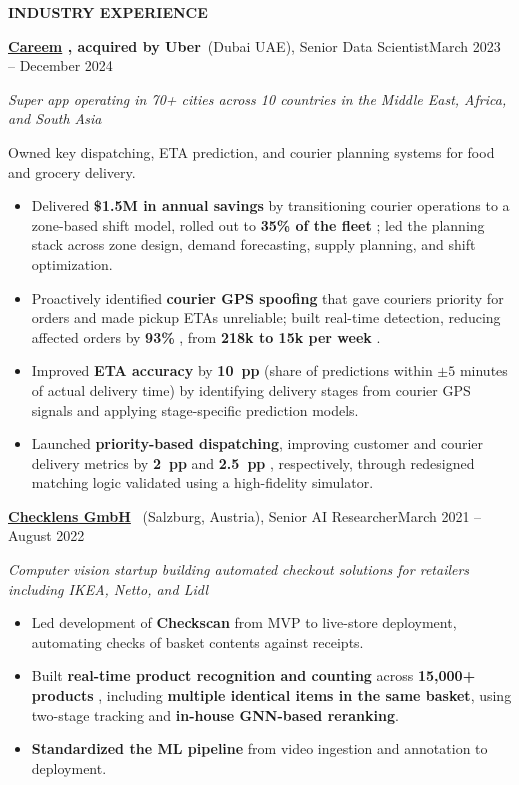 \documentclass[11pt,a4paper]{article}
\newcommand{\sectionletterspacing}[1]{{\addfontfeatures{LetterSpace=14}#1}}
\newcommand{\SectionFont}{\fontsize{15.2}{18.8}\selectfont}
\newcommand{\TitleFont}{\fontsize{12.8}{15.8}\selectfont}
\newcommand{\DateFont}{\fontsize{12.1}{15.0}\selectfont}
\newcommand{\DescFont}{\fontsize{10.2}{12.7}\selectfont}
\newcommand{\muted}[1]{\textcolor{secondary}{#1}}
\newcommand{\metric}[1]{%
  \textcolor{accent}{\textbf{#1}}%
}
\newcommand{\companylink}[2]{%
  \href{#2}{\textcolor{textgray}{#1}}%
}
\newcommand{\sectiontitle}[1]{%
  \vspace{0.64em}
  {\centering\SectionFont\bfseries\textcolor{accent}{\sectionletterspacing{#1}}\par}
  \vspace{0.28em}
}
\newcommand{\jobtitle}[4]{%
  {\TitleFont\bfseries #1}{\TitleFont\textnormal{\muted{\ (#2)}}}{\TitleFont\textnormal{, #3}}\hfill{\DateFont\textnormal{\muted{#4}}}\par
}
\newcommand{\jobgap}{\vspace{0.55em}}
\begin{document}
\sectiontitle{INDUSTRY EXPERIENCE}

\jobtitle{\companylink{Careem}{https://www.careem.com/}\textnormal{, acquired by Uber}}{Dubai UAE}{Senior Data Scientist}{March 2023 -- December 2024}
{\DescFont\muted{\textit{Super app operating in 70+ cities across 10 countries in the Middle East, Africa, and South Asia}}\par}
Owned key dispatching, ETA prediction, and courier planning systems for food and grocery delivery.\par
\begin{itemize}
  \item Delivered \metric{\$1.5M in annual savings} by transitioning courier operations to a zone-based shift model, rolled out to \metric{35\% of the fleet}; led the planning stack across zone design, demand forecasting, supply planning, and shift optimization.
  \item Proactively identified \textbf{courier GPS spoofing} that gave couriers priority for orders and made pickup ETAs unreliable; built real-time detection, reducing affected orders by \metric{93\%}, from \metric{218k to 15k per week}.
  \item Improved \textbf{ETA accuracy} by \metric{10~pp} (share of predictions within \(\pm 5\) minutes of actual delivery time) by identifying delivery stages from courier GPS signals and applying stage-specific prediction models.
  \item Launched \textbf{priority-based dispatching}, improving customer and courier delivery metrics by \metric{2~pp} and \metric{2.5~pp}, respectively, through redesigned matching logic validated using a high-fidelity simulator.
\end{itemize}

\jobgap
\jobtitle{\companylink{Checklens GmbH}{https://checklens.ai/}}{Salzburg, Austria}{Senior AI Researcher}{March 2021 -- August 2022}
{\DescFont\muted{\textit{Computer vision startup building automated checkout solutions for retailers including IKEA, Netto, and Lidl}}\par}
\begin{itemize}
  \item Led development of \textbf{Checkscan} from MVP to live-store deployment, automating checks of basket contents against receipts.
  \item Built \textbf{real-time product recognition and counting} across \metric{15,000+ products}, including \textbf{multiple identical items in the same basket}, using two-stage tracking and \textbf{in-house GNN-based reranking}.
  \item \textbf{Standardized the ML pipeline} from video ingestion and annotation to deployment.
\end{itemize}
\end{document}
